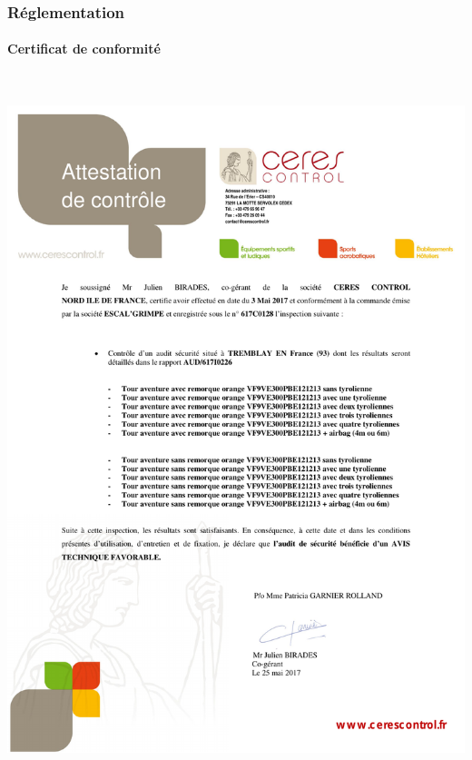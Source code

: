 \documentclass[hidelinks, paper=a4, fontsize=13pt]{report}
\begin{document}
\subsubsection{Réglementation}
\paragraph{Certificat de conformité}\mbox{}\\


\begin{center}
\includegraphics[width=.8\textwidth,keepaspectratio]{Annexes/Documents/ESCAL-Grimpe-document-Attestation-conformite-Tour-Aventure}


\end{center}
\end{document}
